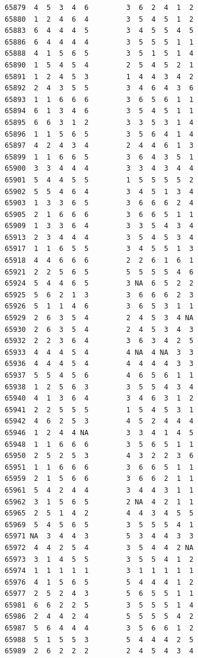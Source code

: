 \documentclass[
  letterpaper,
  DIV=11,
  numbers=noendperiod]{scrreprt}
\begin{document}
\begin{verbatim}
65879  4  5  3  4  6         3  6  2  4  1  2
65880  1  2  4  6  4         3  5  4  5  1  2
65883  6  4  4  4  5         3  4  5  5  4  5
65886  6  4  4  4  4         3  5  5  5  1  1
65888  4  1  5  6  5         3  5  1  5  1  4
65890  1  5  4  5  4         2  5  4  5  2  1
65891  1  2  4  5  3         1  4  4  3  4  2
65892  2  4  3  5  5         3  4  6  4  3  6
65893  1  1  6  6  6         3  6  5  6  1  1
65894  6  1  3  4  6         3  5  4  5  1  1
65895  6  6  3  1  2         3  3  5  3  1  4
65896  1  1  5  6  5         3  5  6  4  1  4
65897  4  2  4  3  4         2  4  4  6  1  3
65899  1  1  6  6  5         3  6  4  3  5  1
65900  3  3  4  4  4         3  3  4  3  4  4
65901  5  4  4  5  5         1  5  5  5  5  2
65902  5  5  4  6  4         3  4  5  1  3  4
65903  1  3  3  6  5         3  6  6  6  2  4
65905  2  1  6  6  6         3  6  6  5  1  1
65909  1  3  3  6  4         3  3  5  4  3  4
65913  2  3  4  4  4         3  5  4  5  3  4
65917  1  1  6  5  5         3  4  5  5  1  3
65918  4  4  6  6  6         2  2  6  1  6  1
65921  2  2  5  6  5         5  5  5  5  4  6
65924  5  4  4  6  5         3 NA  6  5  2  2
65925  5  6  2  1  3         3  6  6  6  2  3
65926  5  1  1  4  6         3  6  5  3  1  1
65929  2  6  3  5  4         2  4  5  3  4 NA
65930  2  6  3  5  4         2  4  5  3  4  3
65932  2  2  3  6  4         3  6  3  4  2  5
65933  4  4  4  5  4         4 NA  4 NA  3  3
65936  4  4  4  5  4         4  4  4  4  3  3
65937  5  5  4  5  6         4  6  5  6  1  1
65938  1  2  5  6  3         3  5  5  4  3  4
65940  4  1  3  6  4         3  4  6  3  1  2
65941  2  2  5  5  5         1  5  4  5  3  1
65942  4  6  2  5  3         4  5  2  4  4  4
65946  1  2  4  4 NA         3  3  4  1  4  5
65948  1  1  6  6  6         3  5  6  5  1  1
65950  2  5  2  5  3         4  3  2  2  3  6
65951  1  1  6  6  6         3  6  6  5  1  1
65959  2  1  5  6  6         3  6  6  2  1  1
65961  5  4  2  4  4         3  4  4  3  1  1
65962  3  1  5  6  5         2 NA  4  2  1  1
65965  2  5  1  4  2         4  4  3  4  5  5
65969  5  4  5  6  5         3  5  5  5  4  1
65971 NA  3  4  4  3         5  3  4  4  3  3
65972  4  4  2  5  4         3  5  4  4  2 NA
65973  3  1  4  5  5         3  5  5  4  1  2
65974  1  1  1  1  1         3  1  1  1  1  1
65976  4  1  5  6  5         5  4  4  4  1  2
65977  2  5  2  4  3         5  6  5  5  1  1
65981  6  6  2  2  5         3  5  5  5  1  4
65986  2  4  4  2  4         5  5  5  5  4  2
65987  5  6  4  4  4         3  5  6  6  1  2
65988  5  1  5  5  3         5  4  4  4  2  5
65989  2  6  2  2  2         2  4  5  4  3  4

\end{verbatim}
\end{document}
